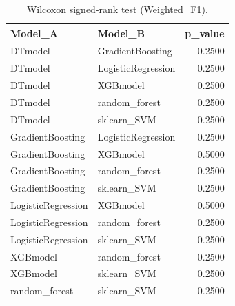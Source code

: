\begin{table}[t]
\centering
\begin{tabular}{llr}
\toprule
Model_A & Model_B & p_value \\
\midrule
DTmodel & GradientBoosting & 0.2500 \\
DTmodel & LogisticRegression & 0.2500 \\
DTmodel & XGBmodel & 0.2500 \\
DTmodel & random_forest & 0.2500 \\
DTmodel & sklearn_SVM & 0.2500 \\
GradientBoosting & LogisticRegression & 0.2500 \\
GradientBoosting & XGBmodel & 0.5000 \\
GradientBoosting & random_forest & 0.2500 \\
GradientBoosting & sklearn_SVM & 0.2500 \\
LogisticRegression & XGBmodel & 0.5000 \\
LogisticRegression & random_forest & 0.2500 \\
LogisticRegression & sklearn_SVM & 0.2500 \\
XGBmodel & random_forest & 0.2500 \\
XGBmodel & sklearn_SVM & 0.2500 \\
random_forest & sklearn_SVM & 0.2500 \\
\bottomrule
\end{tabular}
\caption{Wilcoxon signed-rank test (Weighted_F1).}
\label{tab:wilcoxon_Weighted_F1}
\end{table}